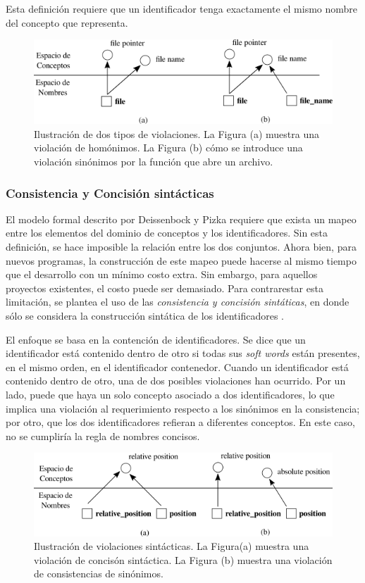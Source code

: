 Esta definición requiere que un identificador tenga exactamente el mismo nombre del concepto que representa.

\begin{figure}[H]
  \includegraphics[width=12cm]{identifier_analysis/violations}
  \centering
  \caption{Ilustración de dos tipos de violaciones. La Figura (a) muestra una violación de homónimos. La Figura (b) cómo se introduce una violación sinónimos por la función que abre un archivo.}
\end{figure}

\subsubsection{Consistencia y Concisión sintácticas}
El modelo formal descrito por Deissenbock y Pizka requiere que exista un mapeo entre los elementos del dominio de conceptos y los identificadores.
Sin esta definición, se hace imposible la relación entre los dos conjuntos.
Ahora bien, para nuevos programas, la construcción de este mapeo puede hacerse al mismo tiempo que el desarrollo con un mínimo costo extra.
Sin embargo, para aquellos proyectos existentes, el costo puede ser demasiado.
Para contrarestar esta limitación, se plantea el uso de las \textit{consistencia y concisión sintáticas}, en donde sólo se considera la construcción sintática de los identificadores \cite{LawrieFeildBinkley06}.

El enfoque se basa en la contención de identificadores.
Se dice que un identificador está contenido dentro de otro si todas sus \textit{soft words} están presentes, en el mismo orden, en el identificador contenedor.
Cuando un identificador está contenido dentro de otro, una de dos posibles violaciones han ocurrido.
Por un lado, puede que haya un solo concepto asociado a dos identificadores, lo que implica una violación al requerimiento respecto a los sinónimos en la consistencia; por otro, que los dos identificadores refieran a diferentes conceptos.
En este caso, no se cumpliría la regla de nombres concisos.

\begin{figure}[H]
  \includegraphics[width=12cm]{identifier_analysis/syntactic_violations}
  \centering
  \caption{Ilustración de violaciones sintácticas. La Figura(a) muestra una violación de concisón sintáctica. La Figura (b) muestra una violación de consistencias de sinónimos.}
\end{figure}

